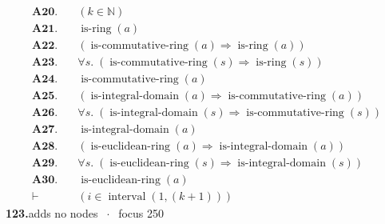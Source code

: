 \documentclass[11pt]{article}
\theoremstyle{plain}
\newcommand{\fit}[1]{\resizebox{\ifdim\width>\linewidth\linewidth\else\width\fi}{!}{#1}}
\begin{document}
\begin{align*}
  \mathbf{A20.}\quad & (k \in \mathbb{N}) \\
  \mathbf{A21.}\quad & \operatorname{is\text{-}ring}(a) \\
  \mathbf{A22.}\quad & (\operatorname{is\text{-}commutative\text{-}ring}(a) \Rightarrow \operatorname{is\text{-}ring}(a)) \\
  \mathbf{A23.}\quad & \forall s.\; (\operatorname{is\text{-}commutative\text{-}ring}(s) \Rightarrow \operatorname{is\text{-}ring}(s)) \\
  \mathbf{A24.}\quad & \operatorname{is\text{-}commutative\text{-}ring}(a) \\
  \mathbf{A25.}\quad & (\operatorname{is\text{-}integral\text{-}domain}(a) \Rightarrow \operatorname{is\text{-}commutative\text{-}ring}(a)) \\
  \mathbf{A26.}\quad & \forall s.\; (\operatorname{is\text{-}integral\text{-}domain}(s) \Rightarrow \operatorname{is\text{-}commutative\text{-}ring}(s)) \\
  \mathbf{A27.}\quad & \operatorname{is\text{-}integral\text{-}domain}(a) \\
  \mathbf{A28.}\quad & (\operatorname{is\text{-}euclidean\text{-}ring}(a) \Rightarrow \operatorname{is\text{-}integral\text{-}domain}(a)) \\
  \mathbf{A29.}\quad & \forall s.\; (\operatorname{is\text{-}euclidean\text{-}ring}(s) \Rightarrow \operatorname{is\text{-}integral\text{-}domain}(s)) \\
  \mathbf{A30.}\quad & \operatorname{is\text{-}euclidean\text{-}ring}(a) \\
  \vdash\quad & (i \in \operatorname{interval}(1, (k + 1)))
\end{align*}
\medskip\noindent\textbf{123.}\quad \fit{\texttt{(ass)}}\hfill{\small adds no nodes $\;\cdot\;$ focus 250}\\[2pt]
\end{document}
